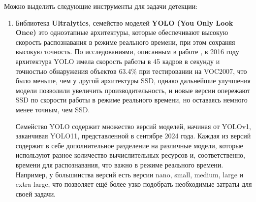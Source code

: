 \documentclass[a4paper,12pt]{article}
\begin{document}
Можно выделить следующие инструменты для задачи детекции:
\begin{enumerate}
    \item Библиотека \textbf{Ultralytics}, семейство моделей \textbf{YOLO (You Only Look Once)} это одноэтапные архитектуры, которые обеспечивают высокую скорость распознавания в режиме реального времени, при этом сохраняя высокую точность. По исследованиями, описанным в работе \cite{liu}, в 2016 году архитектура YOLO имела скорость работы в 45 кадров в секунду и точностью обнаружения объектов 63.4\% при тестировании на VOC2007, что было меньше, чем у другой архитектуры SSD, однако дальнейшие улучшения модели позволили увеличить производительность, и новые версии опережают SSD по скорости работы в режиме реального времени, но оставаясь немного менее точным, чем SSD.
    
    Семейство YOLO содержит множество версий моделей, начиная от YOLOv1, заканчивая YOLO11, представленной в сентябре 2024 года.
    Каждая из версий содержит в себе дополнительное разделение на различные модели, которые используют разное количество вычислительных ресурсов и, соответственно, времени для распознавания, что важно в режиме реального времени. Например, у большинства версий есть версии nano, small, medium, large и extra-large, что позволяет ещё более узко подобрать необходимые затраты для своей задачи.


\end{enumerate}
\end{document}
